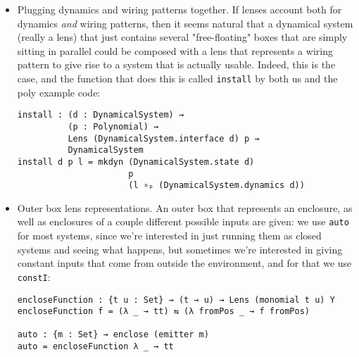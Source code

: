 \begin{itemize}
    \item Plugging dynamics and wiring patterns together. If lenses account both for dynamics \textit{and} wiring patterns, then it seems natural that a dynamical system (really a lens) that just contains several "free-floating" boxes that are simply sitting in parallel could be composed with a lens that represents a wiring pattern to give rise to a system that is actually usable. Indeed, this is the case, and the function that does this is called \texttt{install} by both us and the poly example code:
    \begin{verbatim}
install : (d : DynamicalSystem) → 
          (p : Polynomial) → 
          Lens (DynamicalSystem.interface d) p → 
          DynamicalSystem
install d p l = mkdyn (DynamicalSystem.state d)
                      p 
                      (l ∘ₚ (DynamicalSystem.dynamics d))
\end{verbatim}
    \item Outer box lens representations. An outer box that represents an enclosure, as well as enclosures of a couple different possible inputs are given: we use \texttt{auto} for most systems, since we're interested in just running them as closed systems and seeing what happens, but sometimes we're interested in giving constant inputs that come from outside the environment, and for that we use \texttt{constI}:
\begin{verbatim}
encloseFunction : {t u : Set} → (t → u) → Lens (monomial t u) Y
encloseFunction f = (λ _ → tt) ⇆ (λ fromPos _ → f fromPos)

auto : {m : Set} → enclose (emitter m)
auto = encloseFunction λ _ → tt


\end{verbatim}
\end{itemize}
